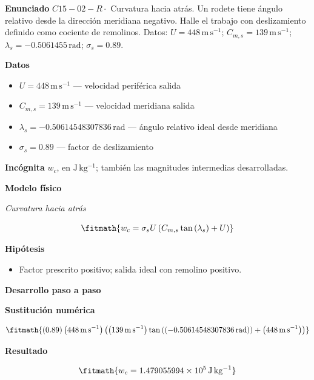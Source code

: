 \documentclass[10pt,openany]{book}
\begin{document}
\begin{tcolorbox}[title={Problema resuelto 2}, studiumworked, breakable]

\noindent\textbf{Enunciado}
\(C15-02-R \cdot\) Curvatura hacia atrás. Un rodete tiene ángulo relativo desde la dirección meridiana negativo. Halle el trabajo con deslizamiento definido como cociente de remolinos. Datos: \(U=448\, \mathrm{m}\,\mathrm{s}^{-1}\); \(C_{m,s}=139\, \mathrm{m}\,\mathrm{s}^{-1}\); \(\lambda_s=-0.5061455\, \mathrm{rad}\); \(\sigma_s=0.89\).

\noindent\textbf{Datos}
\begin{itemize}
\item $U = 448\,\mathrm{m}\,\mathrm{s}^{-1}$ — velocidad periférica salida
\item $C_{m,s} = 139\,\mathrm{m}\,\mathrm{s}^{-1}$ — velocidad meridiana salida
\item $\lambda_s = -0.50614548307836\,\mathrm{rad}$ — ángulo relativo ideal desde meridiana
\item $\sigma_s = 0.89$ — factor de deslizamiento
\end{itemize}

\noindent\textbf{Incógnita}
$w_c$, en $\mathrm{J\,kg^{-1}}$; también las magnitudes intermedias desarrolladas.

\noindent\textbf{Modelo físico}

\noindent\textit{Curvatura hacia atrás}

\[
\fitmath{w_c=\sigma_s U \left(C_{m,s} \tan{\left(\lambda_s \right)} + U\right)}
\]

\noindent\textbf{Hipótesis}
\begin{itemize}
\item Factor prescrito positivo; salida ideal con remolino positivo.
\end{itemize}

\noindent\textbf{Desarrollo paso a paso}



\noindent\textbf{Sustitución numérica}

\[
\fitmath{\left(0.89\right) \left(448\,\mathrm{m}\,\mathrm{s}^{-1}\right) \left(\left(139\,\mathrm{m}\,\mathrm{s}^{-1}\right) \tan{\left(\left(-0.50614548307836\,\mathrm{rad}\right) \right)} + \left(448\,\mathrm{m}\,\mathrm{s}^{-1}\right)\right)}
\]

\noindent\textbf{Resultado}

\[
\fitmath{w_c=1.479055994\times10^{5}\,\mathrm{J}\,\mathrm{kg}^{-1}}
\]


\end{tcolorbox}
\end{document}
